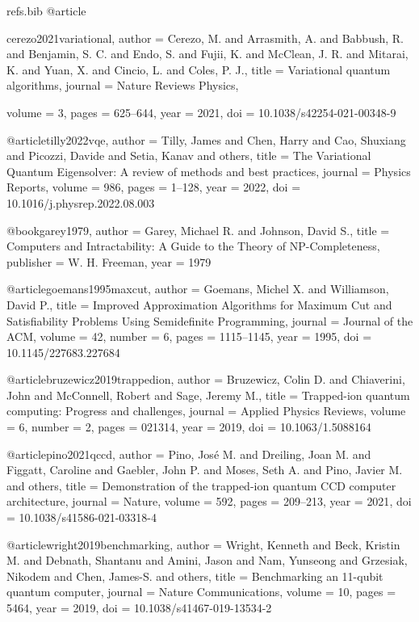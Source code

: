 \begin{filecontents*}{refs.bib}
@article{cerezo2021variational,
  author  = {Cerezo, M. and Arrasmith, A. and Babbush, R. and Benjamin, S. C. and Endo, S. and Fujii, K. and McClean, J. R. and Mitarai, K. and Yuan, X. and Cincio, L. and Coles, P. J.},
  title   = {Variational quantum algorithms},
  journal = {Nature Reviews Physics},
\usepackage{adjustbox}
  volume  = {3},
  pages   = {625--644},
  year    = {2021},
  doi     = {10.1038/s42254-021-00348-9}
}

@article{tilly2022vqe,
  author  = {Tilly, James and Chen, Harry and Cao, Shuxiang and Picozzi, Davide and Setia, Kanav and others},
  title   = {The Variational Quantum Eigensolver: A review of methods and best practices},
  journal = {Physics Reports},
  volume  = {986},
  pages   = {1--128},
  year    = {2022},
  doi     = {10.1016/j.physrep.2022.08.003}
}

@book{garey1979,
  author    = {Garey, Michael R. and Johnson, David S.},
  title     = {Computers and Intractability: A Guide to the Theory of NP-Completeness},
  publisher = {W. H. Freeman},
  year      = {1979}
}

@article{goemans1995maxcut,
  author  = {Goemans, Michel X. and Williamson, David P.},
  title   = {Improved Approximation Algorithms for Maximum Cut and Satisfiability Problems Using Semidefinite Programming},
  journal = {Journal of the ACM},
  volume  = {42},
  number  = {6},
  pages   = {1115--1145},
  year    = {1995},
  doi     = {10.1145/227683.227684}
}

@article{bruzewicz2019trappedion,
  author  = {Bruzewicz, Colin D. and Chiaverini, John and McConnell, Robert and Sage, Jeremy M.},
  title   = {Trapped-ion quantum computing: Progress and challenges},
  journal = {Applied Physics Reviews},
  volume  = {6},
  number  = {2},
  pages   = {021314},
  year    = {2019},
  doi     = {10.1063/1.5088164}
}

@article{pino2021qccd,
  author  = {Pino, Jos{\'e} M. and Dreiling, Joan M. and Figgatt, Caroline and Gaebler, John P. and Moses, Seth A. and Pino, Javier M. and others},
  title   = {Demonstration of the trapped-ion quantum CCD computer architecture},
  journal = {Nature},
  volume  = {592},
  pages   = {209--213},
  year    = {2021},
  doi     = {10.1038/s41586-021-03318-4}
}

@article{wright2019benchmarking,
  author  = {Wright, Kenneth and Beck, Kristin M. and Debnath, Shantanu and Amini, Jason and Nam, Yunseong and Grzesiak, Nikodem and Chen, James-S. and others},
  title   = {Benchmarking an 11-qubit quantum computer},
  journal = {Nature Communications},
  volume  = {10},
  pages   = {5464},
  year    = {2019},
  doi     = {10.1038/s41467-019-13534-2}
}


\end{filecontents*}
